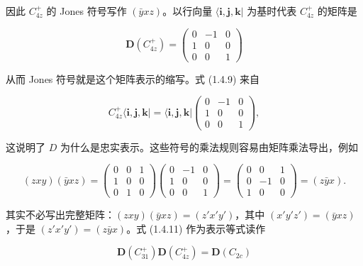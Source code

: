 因此 $C_{4z}^{+}$ 的 Jones 符号写作 $(\bar{y}xz)$。以行向量 $\langle \mathbf{i}, \mathbf{j}, \mathbf{k}|$ 为基时代表 $C_{4z}^{+}$ 的矩阵是

\begin{equation*}
\mathbf{D}(C_{4z}^{+}) = \begin{pmatrix} 0 & -1 & 0 \\ 1 & 0 & 0 \\ 0 & 0 & 1 \end{pmatrix}
\tag{1.4.9}
\end{equation*}

从而 Jones 符号就是这个矩阵表示的缩写。式 (1.4.9) 来自

\begin{equation*}
C_{4z}^{+}\langle \mathbf{i}, \mathbf{j}, \mathbf{k}| = \langle \mathbf{i}, \mathbf{j}, \mathbf{k}| \begin{pmatrix} 0 & -1 & 0 \\ 1 & 0 & 0 \\ 0 & 0 & 1 \end{pmatrix},
\tag{1.4.10}
\end{equation*}

这说明了 $D$ 为什么是忠实表示。这些符号的乘法规则容易由矩阵乘法导出，例如

\begin{equation*}
(zxy)(\bar{y}xz) = \begin{pmatrix} 0 & 0 & 1 \\ 1 & 0 & 0 \\ 0 & 1 & 0 \end{pmatrix} \begin{pmatrix} 0 & -1 & 0 \\ 1 & 0 & 0 \\ 0 & 0 & 1 \end{pmatrix} = \begin{pmatrix} 0 & 0 & 1 \\ 0 & -1 & 0 \\ 1 & 0 & 0 \end{pmatrix} = (z\bar{y}x).
\tag{1.4.11}
\end{equation*}

其实不必写出完整矩阵：$(zxy)(\bar{y}xz) = (z'x'y')$，其中 $(x'y'z') = (\bar{y}xz)$，于是 $(z'x'y') = (z\bar{y}x)$。式 (1.4.11) 作为表示等式读作

\begin{equation*}
\mathbf{D}(C_{31}^{+})\mathbf{D}(C_{4z}^{+}) = \mathbf{D}(C_{2c})
\tag{1.4.12}
\end{equation*}

